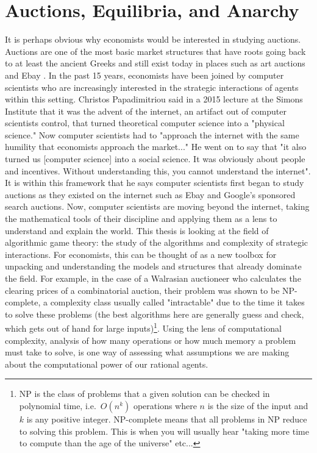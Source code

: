 \documentclass[12pt,twoside]{reedthesis}
\begin{document}
\section{Auctions, Equilibria, and Anarchy}
It is perhaps obvious why economists would be interested in studying auctions. Auctions are one of the most basic market structures that have roots going back to at least the ancient Greeks and still exist today in places such as art auctions and Ebay \citep{Mochon2015}. In the past 15 years, economists have been joined by computer scientists who are increasingly interested in the strategic interactions of agents within this setting. Christos Papadimitriou said in a 2015 lecture at the Simons Institute that it was the advent of the internet, an artifact out of computer scientists control, that turned theoretical computer science into a "physical science." Now computer scientists had to "approach the internet with the same humility that economists approach the market..." He went on to say that "it also turned us [computer science] into a social science. It was obviously about people and incentives. Without understanding this, you cannot understand the internet"\citep{Papadimitriou2015}. It is within this framework that he says computer scientists first began to study auctions as they existed on the internet such as Ebay and Google's sponsored search auctions. Now, computer scientists are moving beyond the internet, taking the mathematical tools of their discipline and applying them as a lens to understand and explain the world. This thesis is looking at the field of algorithmic game theory: the study of the algorithms and complexity of strategic interactions. For economists, this can be thought of as a new toolbox for unpacking and understanding the models and structures that already dominate the field. For example, in the case of a Walrasian auctioneer who calculates the clearing prices of a combinatorial auction, their problem was shown to be NP-complete, a complexity class usually called "intractable" due to the time it takes to solve these problems (the best algorithms here are generally guess and check, which gets out of hand for large inputs)\citep{Papadimitriou2015}\footnote{NP is the class of problems that a given solution can be checked in polynomial time, i.e.~$O(n^k)$ operations where $n$ is the size of the input and $k$ is any positive integer. NP-complete means that all problems in NP reduce to solving this problem. This is when you will usually hear "taking more time to compute than the age of the universe" etc...}. Using the lens of computational complexity, analysis of how many operations or how much memory a problem must take to solve, is one way of assessing what assumptions we are making about the computational power of our rational agents.
\end{document}
